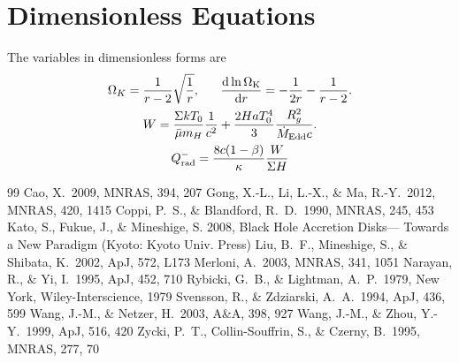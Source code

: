 \documentclass[oneside]{book}
\def\rd{{\rm d}}
\def\mnras{{MNRAS}}
\def\apj{{ApJ}}
\def\apjl{{ApJ}}
\def\aap{{A\&A}}
\begin{document}
\section{Dimensionless Equations}
The variables in dimensionless forms are
\begin{gather}
\Omega_K=\frac{1}{r-2}\sqrt{\frac{1}{r}},~~~~~
\frac{\rd\ln\Omega_{\rm K}}{\rd r}=-\frac{1}{2r}-\frac{1}{r-2}.\\
W=\frac{\Sigma kT_0}{\bar\mu m_H}\frac{1}{c^2} + \frac{2HaT_0^4}{3}\frac{R_g^2}{\dot M_{\rm Edd}c}.\\
Q_{\rm rad}^-=\frac{8c(1-\beta)}{\kappa}\frac{W}{\Sigma H}
\end{gather}

\begin{thebibliography}{99}
   Cao, X.\ 2009, \mnras, 394, 207 
   Gong, X.-L., Li, L.-X., \& Ma, R.-Y.\ 2012, \mnras, 420, 1415  
   Coppi, P.~S., \& Blandford, R.~D.\ 1990, \mnras, 245, 453  
   Kato, S., Fukue, J., \& Mineshige, S. 2008, Black Hole Accretion Disks—
   Towards a New Paradigm (Kyoto: Kyoto Univ. Press)   
   Liu, B.~F., Mineshige, S., \& Shibata, K.\ 2002, \apjl, 572, L173 
   Merloni, A.\ 2003, \mnras, 341, 1051    
   Narayan, R., \& Yi, I.\ 1995, \apj, 452, 710    
   Rybicki, G.~B., \& Lightman, A.~P.\ 1979, New York, Wiley-Interscience, 1979     
   Svensson, R., \& Zdziarski, A.~A.\ 1994, \apj, 436, 599  
   Wang, J.-M., \& Netzer, H.\ 2003, \aap, 398, 927 
   Wang, J.-M., \& Zhou, Y.-Y.\ 1999, \apj, 516, 420    
   Zycki, P.~T., Collin-Souffrin, S., \& Czerny, B.\ 1995, \mnras, 277, 70 
\end{thebibliography}
\end{document}
